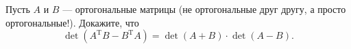 \documentclass{article}
\begin{document}
Пусть $A$ и $B$ --- ортогональные матрицы (не ортогональные друг другу, а просто ортогональные!). Докажите, что
$$\det (A^\mathrm{T} B - B^\mathrm{T} A) = \det (A+B) \cdot \det (A- B).$$
\end{document}
